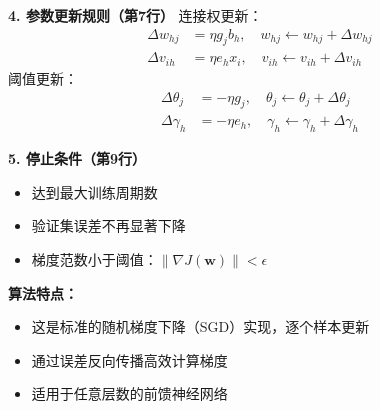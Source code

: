 \begin{example}[多层前馈神经网络的梯度下降算法]
\textbf{4. 参数更新规则（第7行）}
连接权更新：
\begin{align}
\Delta w_{hj} &= \eta g_j b_h, \quad w_{hj} \leftarrow w_{hj} + \Delta w_{hj} \\
\Delta v_{ih} &= \eta e_h x_i, \quad v_{ih} \leftarrow v_{ih} + \Delta v_{ih}
\end{align}
阈值更新：
\begin{align}
\Delta \theta_j &= -\eta g_j, \quad \theta_j \leftarrow \theta_j + \Delta \theta_j \\
\Delta \gamma_h &= -\eta e_h, \quad \gamma_h \leftarrow \gamma_h + \Delta \gamma_h
\end{align}

\textbf{5. 停止条件（第9行）}
\begin{itemize}
\item 达到最大训练周期数
\item 验证集误差不再显著下降
\item 梯度范数小于阈值：$\|\nabla J(\boldsymbol{w})\| < \epsilon$
\end{itemize}

\textbf{算法特点：}
\begin{itemize}
\item 这是标准的随机梯度下降（SGD）实现，逐个样本更新
\item 通过误差反向传播高效计算梯度
\item 适用于任意层数的前馈神经网络
\end{itemize}
\end{example}

